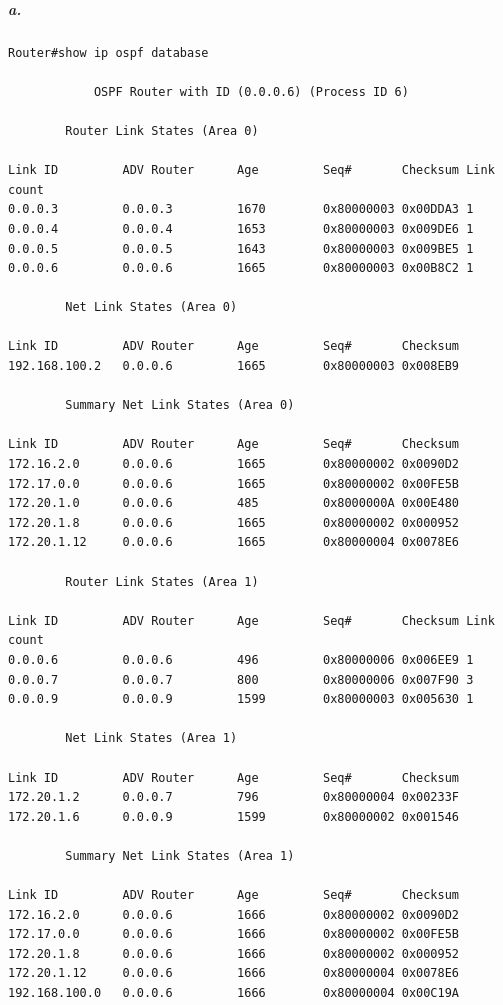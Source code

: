\subparagraph{a.}
\begin{verbatim}
Router#show ip ospf database 

            OSPF Router with ID (0.0.0.6) (Process ID 6)

		Router Link States (Area 0)

Link ID         ADV Router      Age         Seq#       Checksum Link count
0.0.0.3         0.0.0.3         1670        0x80000003 0x00DDA3 1
0.0.0.4         0.0.0.4         1653        0x80000003 0x009DE6 1
0.0.0.5         0.0.0.5         1643        0x80000003 0x009BE5 1
0.0.0.6         0.0.0.6         1665        0x80000003 0x00B8C2 1

		Net Link States (Area 0)

Link ID         ADV Router      Age         Seq#       Checksum
192.168.100.2   0.0.0.6         1665        0x80000003 0x008EB9

		Summary Net Link States (Area 0)

Link ID         ADV Router      Age         Seq#       Checksum
172.16.2.0      0.0.0.6         1665        0x80000002 0x0090D2
172.17.0.0      0.0.0.6         1665        0x80000002 0x00FE5B
172.20.1.0      0.0.0.6         485         0x8000000A 0x00E480
172.20.1.8      0.0.0.6         1665        0x80000002 0x000952
172.20.1.12     0.0.0.6         1665        0x80000004 0x0078E6

		Router Link States (Area 1)

Link ID         ADV Router      Age         Seq#       Checksum Link count
0.0.0.6         0.0.0.6         496         0x80000006 0x006EE9 1
0.0.0.7         0.0.0.7         800         0x80000006 0x007F90 3
0.0.0.9         0.0.0.9         1599        0x80000003 0x005630 1

		Net Link States (Area 1)

Link ID         ADV Router      Age         Seq#       Checksum
172.20.1.2      0.0.0.7         796         0x80000004 0x00233F
172.20.1.6      0.0.0.9         1599        0x80000002 0x001546

		Summary Net Link States (Area 1)

Link ID         ADV Router      Age         Seq#       Checksum
172.16.2.0      0.0.0.6         1666        0x80000002 0x0090D2
172.17.0.0      0.0.0.6         1666        0x80000002 0x00FE5B
172.20.1.8      0.0.0.6         1666        0x80000002 0x000952
172.20.1.12     0.0.0.6         1666        0x80000004 0x0078E6
192.168.100.0   0.0.0.6         1666        0x80000004 0x00C19A
          

\end{verbatim}
